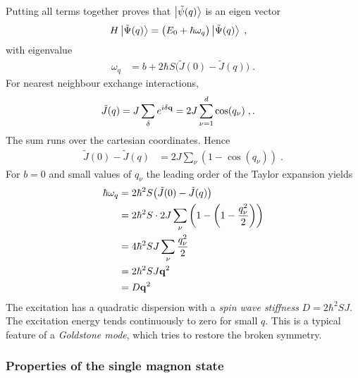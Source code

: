 %
Putting all terms together proves that $\ket{\tilde \psi(q)}$ is an eigen vector 
%
\begin{align}
H \ket{\tilde \Psi(q) } &= \big(E_{0}+\hbar \omega_{q}  \big)
\ket{\tilde \Psi(q) }\;,
\end{align}
%
with eigenvalue 
%
\begin{align}\label{eq:}
 \omega_{q}&= b + 2   \hbar S \big( \tilde J(0)- \tilde J(q) \big) \;.
\end{align}
%
For nearest neighbour exchange interactions, 
%
\begin{align*}
\tilde J(q) &= J \sum_{\mathbf \delta}  e^{i \mathbf \delta \mathbf q} 
=	2 J \sum_{\nu=1}^{d}	 \cos(q_{\nu})\;,.
\end{align*}
% 
The sum runs over the cartesian coordinates.
Hence
%
\begin{align*}
\tilde J(0) - \tilde J(q) &= 2 J \sum_{\nu} (1-\cos(q_{\nu}))\;.
\end{align*}
%
For $b=0$ and small values of $q_{\nu}$ the leading order of the  Taylor expansion yields
%
\begin{align*}
\hbar \omega_{q}&=2\hbar^{2} S \big(\tilde J(0) - \tilde J(q) \big) \\
&= 2\hbar^2 S \cdot 2J \sum_{\nu} \left(1 - \left(1-\frac{q_\nu^2}{2}\right)\right) \\
&= 4\hbar^2 S J \sum_{\nu} \frac{q_\nu^2}{2} \\
&= 2\hbar^2 S J \mathbf q^{2} \\
&= D \mathbf q^{2}
\end{align*}
%
The excitation has a quadratic dispersion with  a {\em spin wave stiffness} $D = 2\hbar^{2} S J$. The excitation energy tends 
continuously to zero for small $q$. This is a typical feature of a {\em Goldstone mode}, which tries to restore the broken symmetry.

\subsubsection{Properties of the single magnon state}


